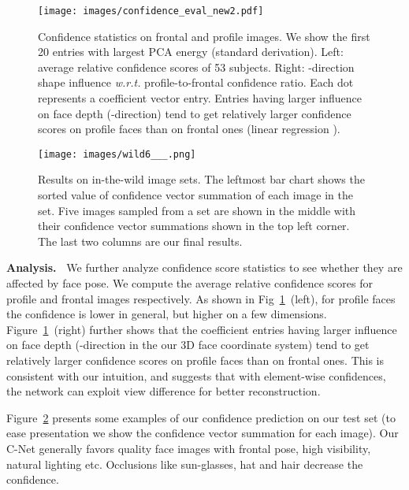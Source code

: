 \documentclass[10pt,twocolumn,letterpaper]{article}
\begin{document}
\begin{figure}
	\centering
	\texttt{[image: images/confidence\_eval\_new2.pdf]}
	\caption{Confidence statistics on frontal and profile images. We show the first 20 entries with largest PCA energy (standard derivation). Left: average relative confidence scores of 53 subjects. Right: -direction shape influence \emph{w.r.t.} profile-to-frontal confidence ratio. Each dot represents a coefficient vector entry.
		Entries having larger influence on face depth (-direction) tend to get relatively larger confidence scores on profile faces than on frontal ones (linear regression ). }\label{fig:confidence}
\end{figure}
\begin{figure}
	\texttt{[image: images/wild6\_\_\_.png]}
	\caption{Results on in-the-wild image sets. The leftmost bar chart shows the sorted value of confidence vector summation of each image in the set. Five images sampled from a set are shown in the middle with their confidence vector summations shown in the top left corner. The last two columns are our final results.
	}\label{fig:wild}
\end{figure}

\vspace{5pt}
\noindent\textbf{Analysis.~}
We further analyze confidence score statistics to see whether they are affected by face pose. We compute the average relative confidence scores for profile and frontal images respectively. As shown in Fig~\ref{fig:confidence}~(left), for profile faces the confidence is lower in general, but higher on a few dimensions. Figure~\ref{fig:confidence}~(right) further shows that the coefficient entries having larger influence on face depth (-direction in the our 3D face coordinate system) tend to get relatively larger confidence scores on profile faces than on frontal ones. This is consistent with our intuition, and suggests that with element-wise confidences, the network can exploit view difference for better reconstruction. 


Figure~\ref{fig:wild} presents some examples of our confidence prediction on our test set (to ease presentation we show the confidence vector summation  for each image). Our C-Net generally favors quality face images with frontal pose, high visibility, natural lighting etc. Occlusions like sun-glasses, hat and hair decrease the confidence.
\end{document}
